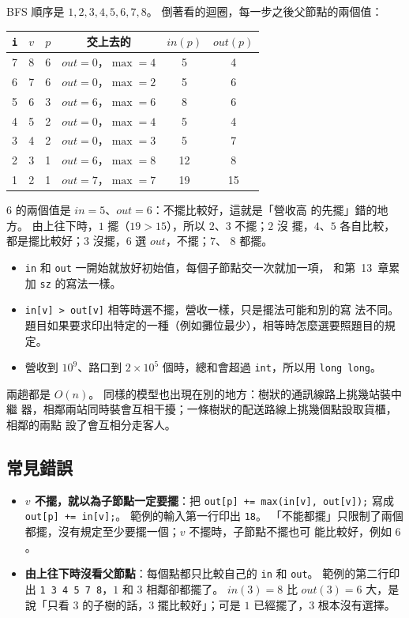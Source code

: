 BFS 順序是 $1, 2, 3, 4, 5, 6, 7, 8$。 倒著看的迴圈，每一步之後父節點的兩個值：

\begin{center}
\begin{tabular}{cccccc}
\toprule
\texttt{i} & $v$ & $p$ & 交上去的 & $\mathit{in}(p)$ & $\mathit{out}(p)$ \\
\midrule
7 & 8 & 6 & $\mathit{out} = 0$，$\max = 4$ & 5 & 4 \\
6 & 7 & 6 & $\mathit{out} = 0$，$\max = 2$ & 5 & 6 \\
5 & 6 & 3 & $\mathit{out} = 6$，$\max = 6$ & 8 & 6 \\
4 & 5 & 2 & $\mathit{out} = 0$，$\max = 4$ & 5 & 4 \\
3 & 4 & 2 & $\mathit{out} = 0$，$\max = 3$ & 5 & 7 \\
2 & 3 & 1 & $\mathit{out} = 6$，$\max = 8$ & 12 & 8 \\
1 & 2 & 1 & $\mathit{out} = 7$，$\max = 7$ & 19 & 15 \\
\bottomrule
\end{tabular}
\end{center}

$6$ 的兩個值是 $\mathit{in} = 5$、$\mathit{out} = 6$：不擺比較好，這就是「營收高
的先擺」錯的地方。 由上往下時，$1$ 擺（$19 > 15$），所以 $2$、$3$ 不擺；$2$ 沒
擺，$4$、$5$ 各自比較，都是擺比較好；$3$ 沒擺，$6$ 選 $\mathit{out}$，不擺；$7$、
$8$ 都擺。

\begin{itemize}
\item \texttt{in} 和 \texttt{out} 一開始就放好初始值，每個子節點交一次就加一項，
和第~13~章累加 \texttt{sz} 的寫法一樣。
\item \texttt{in[v] > out[v]} 相等時選不擺，營收一樣，只是擺法可能和別的寫
法不同。 題目如果要求印出特定的一種（例如攤位最少），相等時怎麼選要照題目的規定。
\item 營收到 $10^9$、路口到 $2 \times 10^5$ 個時，總和會超過 \texttt{int}，所以用
\texttt{long long}。
\end{itemize}

兩趟都是 $O(n)$。 同樣的模型也出現在別的地方：樹狀的通訊線路上挑幾站裝中繼
器，相鄰兩站同時裝會互相干擾；一條樹狀的配送路線上挑幾個點設取貨櫃，相鄰的兩點
設了會互相分走客人。

\subsection{常見錯誤}

\begin{itemize}
\item \textbf{$v$ 不擺，就以為子節點一定要擺}：把 \texttt{out[p] += max(in[v],
out[v]);} 寫成 \texttt{out[p] += in[v];}。 範例的輸入第一行印出 \texttt{18}。
「不能都擺」只限制了兩個都擺，沒有規定至少要擺一個；$v$ 不擺時，子節點不擺也可
能比較好，例如 $6$。
\item \textbf{由上往下時沒看父節點}：每個點都只比較自己的 \texttt{in} 和
\texttt{out}。 範例的第二行印出 \texttt{1 3 4 5 7 8}，$1$ 和 $3$ 相鄰卻都擺了。
$\mathit{in}(3) = 8$ 比 $\mathit{out}(3) = 6$ 大，是說「只看 $3$ 的子樹的話，$3$
擺比較好」；可是 $1$ 已經擺了，$3$ 根本沒有選擇。
\end{itemize}

